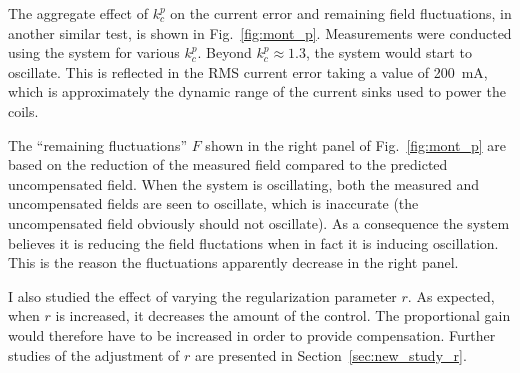 
The aggregate effect of $k_c^p$ on the current error and remaining
field fluctuations, in another similar test, is shown in
Fig.~\ref{fig:mont_p}.  Measurements were conducted using the system
for various $k_c^p$.  Beyond $k_c^p\approx 1.3$, the system would
start to oscillate.  This is reflected in the RMS current error taking
a value of 200~mA, which is approximately the dynamic range of the
current sinks used to power the coils.

The ``remaining fluctuations'' $F$ shown in the right panel of
Fig.~\ref{fig:mont_p} are based on the reduction of the measured field
compared to the predicted uncompensated field.  When the system is
oscillating, both the measured and uncompensated fields are seen to
oscillate, which is inaccurate (the uncompensated field obviously
should not oscillate).  As a consequence the system believes it is
reducing the field fluctations when in fact it is inducing
oscillation.  This is the reason the fluctuations apparently decrease
in the right panel.




I also studied the effect of varying the regularization parameter $r$.
As expected, when $r$ is increased, it decreases the amount of the
control.  The proportional gain would therefore have to be increased
in order to provide compensation.  Further studies of the adjustment
of $r$ are presented in Section~\ref{sec:new_study_r}.




